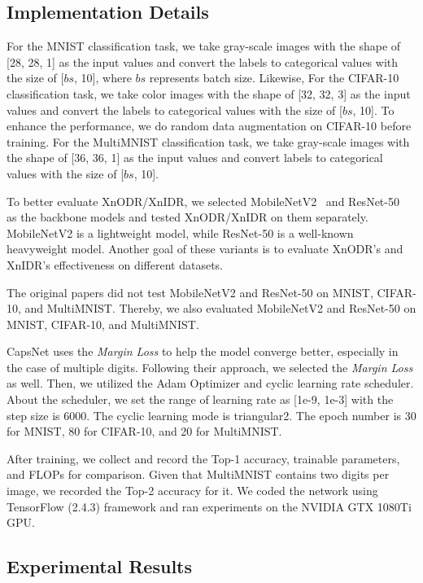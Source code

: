 \documentclass[sn-mathphys,iicol,Numbered]{sn-jnl}
\begin{document}
\subsection{Implementation Details} \label{sec:4.3}

For the MNIST classification task, we take gray-scale images with the shape of [28, 28, 1] as the input values and convert the labels to categorical values with the size of [$bs$, 10], where $bs$ represents batch size. Likewise, For the CIFAR-10 classification task, we take color images with the shape of [32, 32, 3] as the input values and convert the labels to categorical values with the size of [$bs$, 10]. To enhance the performance, we do random data augmentation on CIFAR-10 before training. For the MultiMNIST classification task, we take gray-scale images with the shape of [36, 36, 1] as the input values and convert labels to categorical values with the size of [$bs$, 10]. 

To better evaluate XnODR/XnIDR, we selected MobileNetV2~\citep{A18_MBV2} and ResNet-50~\citep{A19_RES50} as the backbone models and tested XnODR/XnIDR on them separately. MobileNetV2 is a lightweight model, while ResNet-50 is a well-known heavyweight model. Another goal of these variants is to evaluate XnODR's and XnIDR's effectiveness on different datasets.

The original papers did not test MobileNetV2 and ResNet-50 on MNIST, CIFAR-10, and MultiMNIST. Thereby, we also evaluated MobileNetV2 and ResNet-50 on MNIST, CIFAR-10, and MultiMNIST.

CapsNet uses the \textit{Margin Loss} to help the model converge better, especially in the case of multiple digits. Following their approach, we selected the \textit{Margin Loss} as well. Then, we utilized the Adam Optimizer and cyclic learning rate scheduler. About the scheduler, we set the range of learning rate as [1e-9, 1e-3] with the step size is 6000. The cyclic learning mode is triangular2. The epoch number is 30 for MNIST, 80 for CIFAR-10, and 20 for MultiMNIST.

After training, we collect and record the Top-1 accuracy, trainable parameters, and FLOPs for comparison. Given that MultiMNIST contains two digits per image, we recorded the Top-2 accuracy for it. We coded the network using TensorFlow (2.4.3) framework and ran experiments on the NVIDIA GTX 1080Ti GPU.

\subsection{Experimental Results} \label{sec:4.4}
\end{document}
